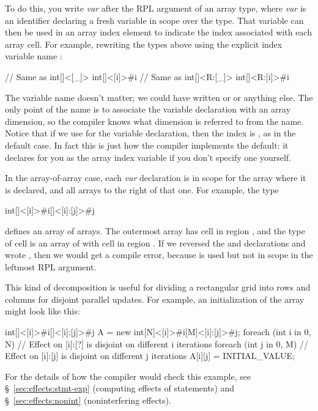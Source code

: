 To do this, you write \kwd{\#}\emph{var} after the RPL argument of an
array type, where \emph{var} is an identifier declaring a fresh
variable in scope over the type.  That variable can then be used in an
array index element to indicate the index associated with each array
cell.  For example, rewriting the types above using the explicit index
variable name :
%
\begin{dpjlisting}
// Same as int[]<[_]>
int[]<[i]>#i
// Same as int[]<R:[_]>
int[]<R:[i]>#i
\end{dpjlisting}
%
The variable name doesn't matter; we could have written  or
 or anything else.  The only point of the name is to associate
the variable declaration with an array dimension, so the compiler
knows what dimension is referred to from the name.  Notice that if we
use \kwd{\#\_} for the variable declaration, then the index is
\kwd{[\_]}, as in the default case.  In fact this is just how the
compiler implements the default: it declares \kwd{\#\_} for you as the
array index variable if you don't specify one yourself.

In the array-of-array case, each \kwd{\#}\emph{var} declaration is in
scope for the array where it is declared, and all arrays to the right
of that one.  For example, the type
%
\begin{dpjlisting}
int[]<[i]>#i[]<[i]:[j]>#j
\end{dpjlisting}
%
defines an array of arrays.  The outermost array has cell  in
region , and the type of cell  is an array of 
with cell  in region \kwd{[i]:[j]}.  If we reversed the 
and  declarations and wrote ,
then we would get a compile error, because  is used but not in
scope in the leftmost RPL argument.

This kind of decomposition is useful for dividing a rectangular grid
into rows and columns for disjoint parallel updates.  For example, an
initialization of the array might look like this:
%
\begin{dpjlisting}
int[]<[i]>#i[]<[i]:[j]>#j A = new int[N]<[i]>#i[M]<[i]:[j]>#j;
foreach (int i in 0, N) {
    // Effect on [i]:[?] is disjoint on different i iterations
    foreach (int j in 0, M) {
        // Effect on [i]:[j] is disjoint on different j iterations
        A[i][j] = INITIAL_VALUE;
    }
}
\end{dpjlisting}
%
For the details of how the compiler would check this example, see
\S~\ref{sec:effects:stmt-exp} (computing effects of statements) and
\S~\ref{sec:effects:nonint} (noninterfering effects).


